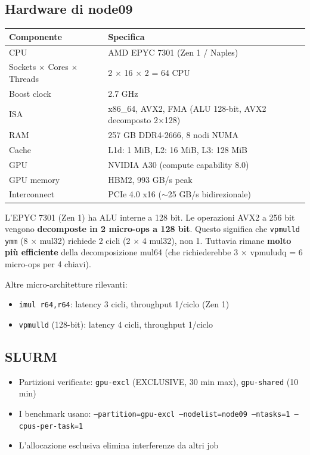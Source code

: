 \documentclass[11pt,a4paper]{article}
\begin{document}
\subsection{Hardware di node09}
\begin{table}[h]
\centering
\begin{tabular}{@{}ll@{}}
\toprule
\textbf{Componente} & \textbf{Specifica} \\
\midrule
CPU & AMD EPYC 7301 (Zen 1 / Naples) \\
Sockets $\times$ Cores $\times$ Threads & 2 $\times$ 16 $\times$ 2 = 64 CPU \\
Boost clock & 2.7 GHz \\
ISA & x86\_64, AVX2, FMA (ALU 128-bit, AVX2 decomposto 2$\times$128) \\
RAM & 257 GB DDR4-2666, 8 nodi NUMA \\
Cache & L1d: 1 MiB, L2: 16 MiB, L3: 128 MiB \\
GPU & NVIDIA A30 (compute capability 8.0) \\
GPU memory & HBM2, 993 GB/s peak \\
Interconnect & PCIe 4.0 x16 ($\sim$25 GB/s bidirezionale) \\
\bottomrule
\end{tabular}
\end{table}

\begin{warnbox}[title=\textbf{Zen 1 e AVX2}]
L'EPYC 7301 (Zen 1) ha ALU interne a 128 bit. Le operazioni AVX2 a 256 bit vengono \textbf{decomposte in 2 micro-ops a 128 bit}. Questo significa che \texttt{vpmulld ymm} (8 $\times$ mul32) richiede 2 cicli (2 $\times$ 4 mul32), non 1. Tuttavia rimane \textbf{molto più efficiente} della decomposizione mul64 (che richiederebbe 3 $\times$ vpmuludq = 6 micro-ops per 4 chiavi).

Altre micro-architetture rilevanti:
\begin{itemize}
    \item \texttt{imul r64,r64}: latency 3 cicli, throughput 1/ciclo (Zen 1)
    \item \texttt{vpmulld} (128-bit): latency 4 cicli, throughput 1/ciclo
\end{itemize}
\end{warnbox}

\subsection{SLURM}
\begin{itemize}
    \item Partizioni verificate: \texttt{gpu-excl} (EXCLUSIVE, 30 min max), \texttt{gpu-shared} (10 min)
    \item I benchmark usano: \texttt{--partition=gpu-excl --nodelist=node09 --ntasks=1 --cpus-per-task=1}
    \item L'allocazione esclusiva elimina interferenze da altri job
\end{itemize}
\end{document}
